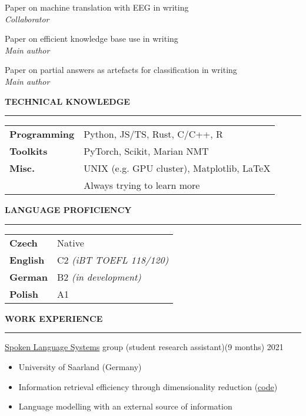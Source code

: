 \documentclass[11pt,a4paper]{article} %
\newcommand{\hSection}[1]{
    \medskip
    \MakeUppercase{\bf #1}
    \medskip
    \hrule
}
\newcommand{\hSubsectionB}[3]{
    {#1} \hfill {\footnotesize #2}\hspace{-1cm}\\
    \vspace{-0.2cm} \hspace{-0.17cm}\textit{\footnotesize #3}
    \vspace{0.05cm}
}
\newcommand{\hSubsectionItemize}[3]{
    {#1}\hfill {\footnotesize #2}\hspace{-1cm}\\
    \vspace{-0.5cm}
    \begin{itemize} \footnotesize #3 \end{itemize}
    \vspace{0.3\baselineskip}
}
\begin{document}
\hSubsectionB
{Paper on machine translation with EEG}
{in writing}
{Collaborator}

\hSubsectionB
{Paper on efficient knowledge base use}
{in writing}
{Main author}

\hSubsectionB
{Paper on partial answers as artefacts for classification}
{in writing}
{Main author}

\vspace{0.1\baselineskip}
\begin{minipage}{.62\textwidth}
    \hSection{Technical Knowledge}
    \hspace{-0.3cm}
    \begin{minipage}{\textwidth}
        \vspace{0.15cm}
        \begin{tabular}{ p{2.4cm} l}
        {\bf Programming} & Python, JS/TS, Rust, C/C++, R \\
        {\bf Toolkits} & PyTorch, Scikit, Marian NMT \\
        {\bf Misc.} & UNIX {\small (e.g. GPU cluster)}, Matplotlib, LaTeX \\
        & Always trying to learn more
        \end{tabular}
    \end{minipage}
\end{minipage}
\begin{minipage}{.38\textwidth}
    \hSection{Language Proficiency}
    \hspace{-0.3cm}
    \begin{minipage}{\textwidth}
        \vspace{0.15cm}
        \begin{tabular}{ p{1.3cm} l}
        {\bf Czech} & Native \\
        {\bf English} & C2 \textit{\footnotesize (iBT TOEFL 118/120)} \\
        {\bf German} & B2 \textit{\footnotesize (in development)} \\
        {\bf Polish} & A1
        \end{tabular}
    \end{minipage}
\end{minipage}

\newpage

\vspace{-0.1cm}
\hSection{Work Experience}
\hSubsectionItemize
{\href{https://www.lsv.uni-saarland.de/}{Spoken Language Systems} group (student research assistant)}
{(9 months) 2021}
{
    \item University of Saarland (Germany)
    \item Information retrieval efficiency through dimensionality reduction (\href{https://github.com/zouharvi/kb-shrink}{code})
    \item Language modelling with an external source of information
}
\end{document}
